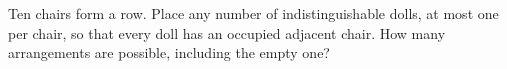 Ten chairs form a row. Place any number of indistinguishable dolls, at most one per chair, so that every doll has an occupied adjacent chair. How many arrangements are possible, including the empty one?
